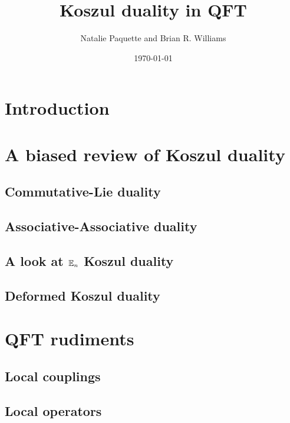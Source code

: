 \documentclass[11pt]{amsart}
\author{Natalie Paquette and Brian R. Williams}
\date{\today}
\title{Koszul duality in QFT}
\begin{document}
\maketitle

\section{Introduction}

\section{A biased review of Koszul duality} 


\subsection{Commutative-Lie duality}


\subsection{Associative-Associative duality} 


\subsection{A look at $\mathbb E_n$ Koszul duality}

\subsection{Deformed Koszul duality}

\section{QFT rudiments}

\subsection{Local couplings} 

\subsection{Local operators}
\end{document}

